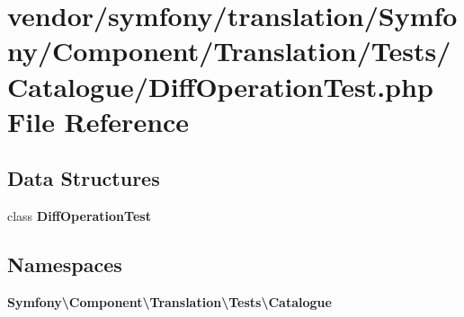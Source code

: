 \section{vendor/symfony/translation/\+Symfony/\+Component/\+Translation/\+Tests/\+Catalogue/\+Diff\+Operation\+Test.php File Reference}
\label{_diff_operation_test_8php}
\subsection*{Data Structures}
\begin{DoxyCompactItemize}
\item 
class {\bf Diff\+Operation\+Test}
\end{DoxyCompactItemize}
\subsection*{Namespaces}
\begin{DoxyCompactItemize}
\item 
 {\bf Symfony\textbackslash{}\+Component\textbackslash{}\+Translation\textbackslash{}\+Tests\textbackslash{}\+Catalogue}
\end{DoxyCompactItemize}
